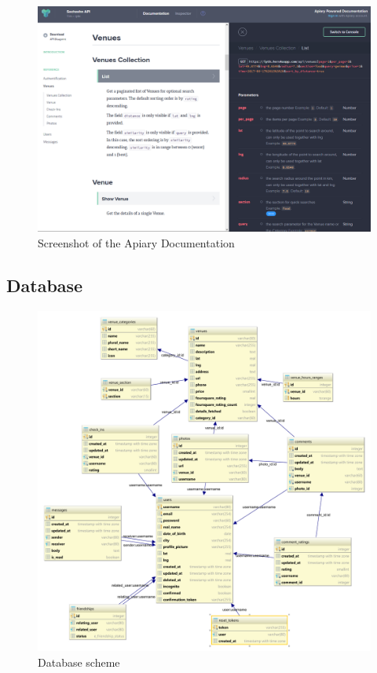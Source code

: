 \documentclass[11pt, accentcolor=tud1c]{tudreport}
\begin{document}
\begin{figure}[ht]
	\includegraphics[width=\textwidth]{./res/apiary.png}
	\caption{Screenshot of the Apiary Documentation}
	\label{fig:apiary}
\end{figure}

\clearpage
\subsection{Database}
\begin{figure}[ht]
	\includegraphics[width=\textwidth]{./res/sechzehn-erm.pdf}
	\caption{Database scheme}
	\label{fig:database_scheme}
\end{figure}
\end{document}
